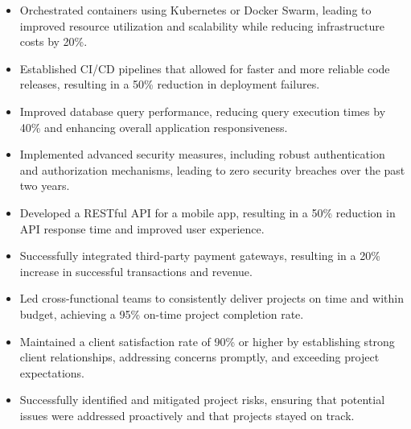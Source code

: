 \documentclass[10pt,a4paper,ragged2e,withhyper]{altacv}
\begin{document}
\begin{paracol}{2}
\begin{itemize}
\item Orchestrated containers using Kubernetes or Docker Swarm, leading to improved resource utilization and scalability while reducing infrastructure costs by 20\%.

\item Established CI/CD pipelines that allowed for faster and more reliable code releases, resulting in a 50\% reduction in deployment failures.
\end{itemize}

\divider


\begin{itemize}
\item Improved database query performance, reducing query execution times by 40\% and enhancing overall application responsiveness.

\item Implemented advanced security measures, including robust authentication and authorization mechanisms, leading to zero security breaches over the past two years.

\item Developed a RESTful API for a mobile app, resulting in a 50\% reduction in API response time and improved user experience.

\item Successfully integrated third-party payment gateways, resulting in a 20\% increase in successful transactions and revenue.
\end{itemize}



\begin{itemize}
\item Led cross-functional teams to consistently deliver projects on time and within budget, achieving a 95\% on-time project completion rate.

\item Maintained a client satisfaction rate of 90\% or higher by establishing strong client relationships, addressing concerns promptly, and exceeding project expectations.

\item Successfully identified and mitigated project risks, ensuring that potential issues were addressed proactively and that projects stayed on track.


\end{itemize}
\end{paracol}
\end{document}
